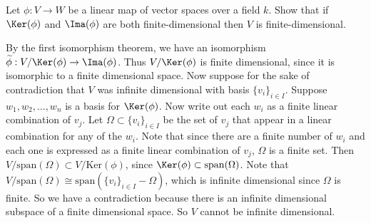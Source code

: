 \begin{problem}
Let $\phi:V\to W$ be a linear map of vector spaces over a field $k$. Show that if $\Ker(\phi)$ and $\Ima(\phi)$ are both finite-dimensional then $V$ is finite-dimensional.
\end{problem}

By the first isomorphism theorem, we have an isomorphism $\widetilde{\phi} : V /\Ker(\phi) \to \Ima(\phi)$. Thus $V/\Ker(\phi)$ is finite dimensional, since it is isomorphic to a finite dimensional space. Now suppose for the sake of contradiction that $V$ was infinite dimensional with basis $\{v_i\}_{i\in I}$. Suppose $w_1,w_2,\ldots,w_n$ is a basis for $\Ker(\phi)$. Now write out each $w_i$ as a finite linear combination of $v_j$. Let $\Omega\subset \{v_i\}_{i\in I}$ be the set of $v_j$ that appear in a linear combination for any of the $w_i$. Note that since there are a finite number of $w_i$ and each one is expressed as a finite linear combination of $v_j$, $\Omega$ is a finite set. Then $V/\mathrm{span}(\Omega)\subset V/\mathrm{Ker}(\phi)$, since $\Ker(\phi)\subset \mathrm{span}(\Omega)$. Note that $V/\mathrm{span}(\Omega)\cong \mathrm{span}(\{v_i\}_{i\in I}-\Omega)$, which is infinite dimensional since $\Omega$ is finite. So we have a contradiction because there is an infinite dimensional subspace of a finite dimensional space. So $V$ cannot be infinite dimensional.     
